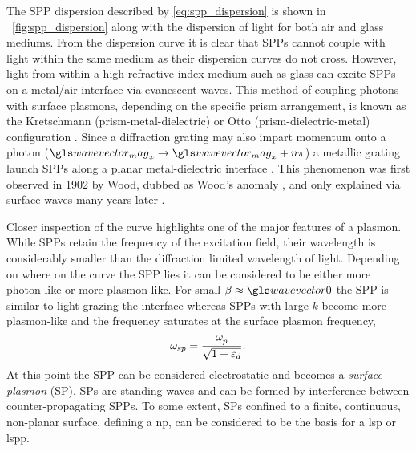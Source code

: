 \documentclass{article}
\begin{document}
The SPP dispersion described by \eqref{eq:spp_dispersion} is shown in \figurename~\ref{fig:spp_dispersion} along with the dispersion of light for both air and glass mediums. From the dispersion curve it is clear that SPPs cannot couple with light within the same medium as their dispersion curves do not cross. However, light from within a high refractive index medium such as glass can excite SPPs on a metal/air interface via evanescent waves. This method of coupling photons with surface plasmons, depending on the specific prism arrangement, is known as the Kretschmann (prism-metal-dielectric) or Otto (prism-dielectric-metal) configuration \cite{otto1968, kretschmann1971}. Since a diffraction grating may also impart momentum onto a photon ($\wvm_x \rightarrow \wvm_x + n\pi$) a metallic grating launch SPPs along a planar metal-dielectric interface \cite{}. This phenomenon was first observed in 1902 by Wood, dubbed as Wood's anomaly \cite{wood1902}, and only explained via surface waves many years later \cite{fano1941}.

Closer inspection of the curve highlights one of the major features of a plasmon. While SPPs retain the frequency of the excitation field, their wavelength is considerably smaller than the diffraction limited wavelength of light.
Depending on where on the curve the SPP lies it can be considered to be either more photon-like or more plasmon-like. For small $\beta\approx\wvz$ the SPP is similar to light grazing the interface whereas SPPs with large $k$ become more plasmon-like and the frequency saturates at the surface plasmon frequency,
\begin{equation}
\omega_{sp} = \frac{\omega_{p}^{}}{\sqrt{1+\varepsilon_d}}.
\end{equation}
At this point the SPP can be considered electrostatic and becomes a \emph{surface plasmon} (SP). {\color{red}SPs are standing waves and can be formed by interference between counter-propagating SPPs.} To some extent, SPs confined to a finite, continuous, non-planar surface, defining a \gls{np}, can be considered to be the basis for a \gls{lsp} {\color{red}or \gls{lspp}}.
\end{document}
